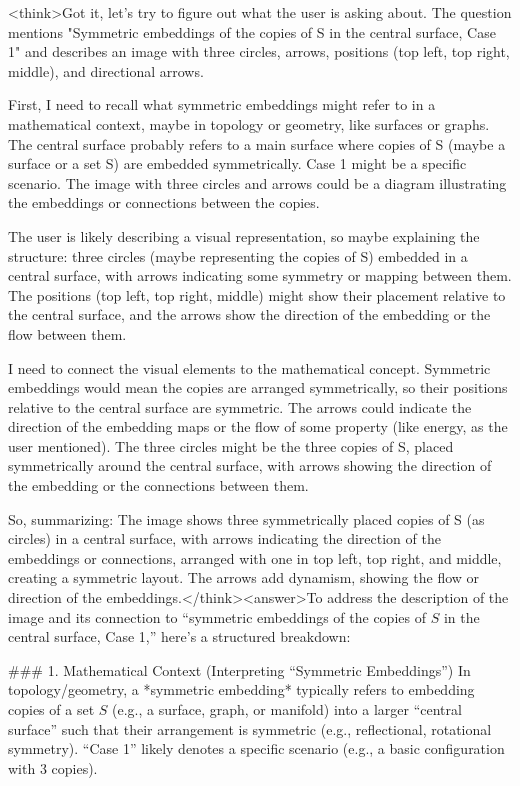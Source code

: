 <think>Got it, let's try to figure out what the user is asking about. The question mentions "Symmetric embeddings of the copies of S in the central surface, Case 1" and describes an image with three circles, arrows, positions (top left, top right, middle), and directional arrows. 

First, I need to recall what symmetric embeddings might refer to in a mathematical context, maybe in topology or geometry, like surfaces or graphs. The central surface probably refers to a main surface where copies of S (maybe a surface or a set S) are embedded symmetrically. Case 1 might be a specific scenario. The image with three circles and arrows could be a diagram illustrating the embeddings or connections between the copies.

The user is likely describing a visual representation, so maybe explaining the structure: three circles (maybe representing the copies of S) embedded in a central surface, with arrows indicating some symmetry or mapping between them. The positions (top left, top right, middle) might show their placement relative to the central surface, and the arrows show the direction of the embedding or the flow between them.

I need to connect the visual elements to the mathematical concept. Symmetric embeddings would mean the copies are arranged symmetrically, so their positions relative to the central surface are symmetric. The arrows could indicate the direction of the embedding maps or the flow of some property (like energy, as the user mentioned). The three circles might be the three copies of S, placed symmetrically around the central surface, with arrows showing the direction of the embedding or the connections between them.

So, summarizing: The image shows three symmetrically placed copies of S (as circles) in a central surface, with arrows indicating the direction of the embeddings or connections, arranged with one in top left, top right, and middle, creating a symmetric layout. The arrows add dynamism, showing the flow or direction of the embeddings.</think><answer>To address the description of the image and its connection to “symmetric embeddings of the copies of \( S \) in the central surface, Case 1,” here’s a structured breakdown:  


### 1. Mathematical Context (Interpreting “Symmetric Embeddings”)  
In topology/geometry, a *symmetric embedding* typically refers to embedding copies of a set \( S \) (e.g., a surface, graph, or manifold) into a larger “central surface” such that their arrangement is symmetric (e.g., reflectional, rotational symmetry). “Case 1” likely denotes a specific scenario (e.g., a basic configuration with 3 copies).  


